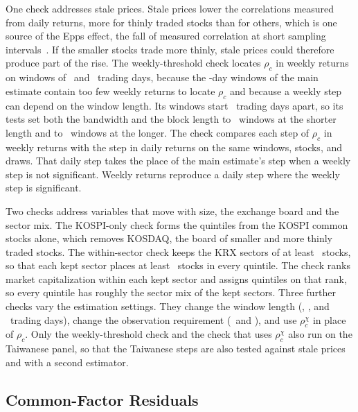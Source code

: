\documentclass[a4paper,fleqn]{cas-sc}
\begin{document}
One check addresses stale prices. Stale prices lower the correlations measured from daily returns, more for thinly traded stocks than for others, which is one source of the Epps effect, the fall of measured correlation at short sampling intervals~\citep{epps1979comovements}. If the smaller stocks trade more thinly, stale prices could therefore produce part of the rise. The weekly-threshold check locates $\rho_c$ in weekly returns on windows of \wkWindowShort\ and \wkWindowLong\ trading days, because the \paperWindowDays-day windows of the main estimate contain too few weekly returns to locate $\rho_c$ and because a weekly step can depend on the window length. Its windows start \paperStepDays\ trading days apart, so its tests set both the bandwidth and the block length to \wkLagShort\ windows at the shorter length and to \wkLagLong\ windows at the longer. The check compares each step of $\rho_c$ in weekly returns with the step in daily returns on the same windows, stocks, and draws. That daily step takes the place of the main estimate's step when a weekly step is not significant. Weekly returns reproduce a daily step where the weekly step is significant.

Two checks address variables that move with size, the exchange board and the sector mix. The KOSPI-only check forms the quintiles from the KOSPI common stocks alone, which removes KOSDAQ, the board of smaller and more thinly traded stocks. The within-sector check keeps the KRX sectors of at least \minSectorSize\ stocks, so that each kept sector places at least \minSectorStocksPerQuintile\ stocks in every quintile. The check ranks market capitalization within each kept sector and assigns quintiles on that rank, so every quintile has roughly the sector mix of the kept sectors. Three further checks vary the estimation settings. They change the window length (\windowDaysWthirty, \windowDaysWhundredtwenty, and \windowDaysWtwofifty\ trading days), change the observation requirement (\minValidFractionLoPct\ and \minValidFractionHiPct), and use $\rho_c^{\chi}$ in place of $\rho_c$. Only the weekly-threshold check and the check that uses $\rho_c^{\chi}$ also run on the Taiwanese panel, so that the Taiwanese steps are also tested against stale prices and with a second estimator.

\subsection{Common-Factor Residuals}\label{subsec:residual_method}
\end{document}
